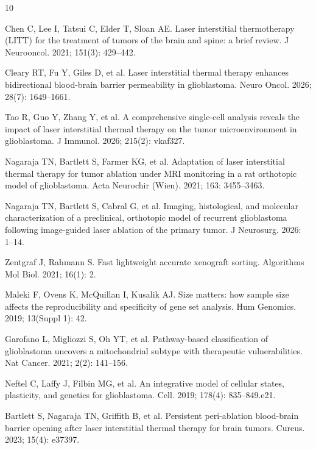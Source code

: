 \documentclass[unnumsec,webpdf,contemporary,large]{oup-authoring-template}
\begin{document}
\begin{thebibliography}{10}

Chen C, Lee I, Tatsui C, Elder T, Sloan AE. Laser interstitial thermotherapy (LITT) for the treatment of tumors of the brain and spine: a brief review. J Neurooncol. 2021; 151(3): 429--442.

Cleary RT, Fu Y, Giles D, et al. Laser interstitial thermal therapy enhances bidirectional blood-brain barrier permeability in glioblastoma. Neuro Oncol. 2026; 28(7): 1649--1661.

Tao R, Guo Y, Zhang Y, et al. A comprehensive single-cell analysis reveals the impact of laser interstitial thermal therapy on the tumor microenvironment in glioblastoma. J Immunol. 2026; 215(2): vkaf327.

Nagaraja TN, Bartlett S, Farmer KG, et al. Adaptation of laser interstitial thermal therapy for tumor ablation under MRI monitoring in a rat orthotopic model of glioblastoma. Acta Neurochir (Wien). 2021; 163: 3455--3463.

Nagaraja TN, Bartlett S, Cabral G, et al. Imaging, histological, and molecular characterization of a preclinical, orthotopic model of recurrent glioblastoma following image-guided laser ablation of the primary tumor. J Neurosurg. 2026: 1--14.

Zentgraf J, Rahmann S. Fast lightweight accurate xenograft sorting. Algorithms Mol Biol. 2021; 16(1): 2.

Maleki F, Ovens K, McQuillan I, Kusalik AJ. Size matters: how sample size affects the reproducibility and specificity of gene set analysis. Hum Genomics. 2019; 13(Suppl 1): 42.

Garofano L, Migliozzi S, Oh YT, et al. Pathway-based classification of glioblastoma uncovers a mitochondrial subtype with therapeutic vulnerabilities. Nat Cancer. 2021; 2(2): 141--156.

Neftel C, Laffy J, Filbin MG, et al. An integrative model of cellular states, plasticity, and genetics for glioblastoma. Cell. 2019; 178(4): 835--849.e21.

Bartlett S, Nagaraja TN, Griffith B, et al. Persistent peri-ablation blood-brain barrier opening after laser interstitial thermal therapy for brain tumors. Cureus. 2023; 15(4): e37397.

\end{thebibliography}
\end{document}
